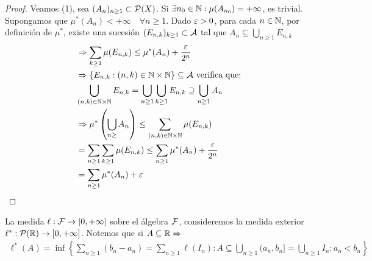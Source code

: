 \begin{theorem}
\begin{proof}
        Veamos (1), sea $(A_n)_{n \geq 1} \subset \mathcal{P}(X)$. Si $\exists n_0 \in \mathbb{N} : \mu(A_{n_0}) = +\infty$, es trivial. Supongamos que $\mu^*(A_n) < +\infty \quad \forall n \geq 1$.
        Dado $\varepsilon > 0$, para cada $n \in \mathbb{N}$, por definición de $\mu^*$, existe una sucesión $(E_{n, k})_{k \geq 1} \subset \mathcal{A}$ tal que $A_n \subseteq \bigcup_{n \geq 1} E_{n, k}$
        \begin{align*}
             & \Rightarrow \sum_{k \geq 1} \mu(E_{n, k}) \leq \mu^*(A_n) + \frac{\varepsilon}{2^n}                                                    \\
             & \Rightarrow \left\{ E_{n, k} : (n, k) \in \mathbb{N} \times \mathbb{N} \right\} \subseteq \mathcal{A} \text{ verifica que:}                        \\
             & \bigcup_{(n, k) \in \mathbb{N} \times \mathbb{N}} E_{n, k}  = \bigcup_{n \geq 1} \bigcup_{k \geq 1} E_{n, k} \supseteq \bigcup_{n \geq 1} A_n \\
             & \Rightarrow \mu^*\left( \bigcup_{n \geq } A_n \right) \leq \sum_{(n, k) \in \mathbb{N} \times \mathbb{N}} \mu(E_{n, k})                       \\
             & = \sum_{n \geq 1} \sum_{k \geq 1} \mu(E_{n, k}) \leq \sum_{n \geq 1} \mu^*(A_n) + \frac{\varepsilon}{2^n}                              \\
             & = \sum_{n \geq 1} \mu^*(A_n) + \varepsilon
        \end{align*}
    \end{proof}
\end{theorem}

\begin{eg}
    La medida $\ell : \mathcal{F} \to [0, +\infty]$ sobre el álgebra $\mathcal{F}$, consideremos la medida exterior $\ell^*: \mathcal{P}(\mathbb{R}) \to [0, +\infty]$.
    Notemos que si $A \subseteq \mathbb{R} \Rightarrow$ \begin{align*}
        \ell^*(A) = \inf \left\{ \sum_{n \geq 1} (b_n - a_n) = \sum_{n \geq 1} \ell(I_n) : A \subseteq \bigcup_{n \geq 1} (a_n, b_n] = \bigcup_{n \geq 1}  I_n : a_n < b_n \right\}
    \end{align*}
\end{eg}


